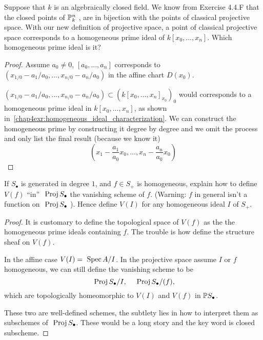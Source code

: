 \documentclass[11pt,fleqn]{book} %
\begin{document}
\begin{exr}
Suppose that $k$ is an algebraically closed field. We know from Exercise 4.4.F that the closed points of $\mathbb P^n_k$ , are in bijection with the points of classical projective space. With our new definition of projective space, a point of classical projective space corresponds to a homogeneous prime ideal of $k[x_0,...,x_n]$. Which homogeneous prime ideal is it?
\end{exr}
\begin{proof} Assume $a_0\neq 0$,
$[a_0,...,a_n]$ corresponds to $(x_{1/0}-a_1/a_0,...,x_{n/0}-a_n/a_0)$ in the affine chart $D(x_0)$.

$(x_{1/0}-a_1/a_0,...,x_{n/0}-a_n/a_0)\subset (k[x_0,...,x_n]_{x_0})_0$ would corresponds to a homogeneous prime ideal in $k[x_0,...,x_n]$, as shown in~\ref{chap4exr:homogeneous_ideal_characterization}. We can construct the homogeneous prime by constructing it degree by degree and we omit the process and only list the final result (because we know it)
$$
\left(x_1-\frac{a_1}{a_0}x_0,...,x_n-\frac{a_n}{a_0}x_0\right)
$$
\end{proof}

\begin{exr}
If $S_\bullet$ is generated in degree $1$, and $f \in S_+$ is homogeneous, explain how to define $V(f)$ ``in'' $\text{ Proj\,} S_\bullet$ the vanishing scheme of $f$. 
(Warning: $f$ in general isn’t a function on $\text{ Proj\,} S_\bullet$ ). Hence define $V(I)$ for any homogeneous ideal $I$ of $S_+$.
\end{exr}
\begin{proof}
It is customary to define the topological space of $V(f)$ as the the homogeneous prime ideals containing $f$. The trouble is how define the structure sheaf on $V(f)$. 

In the affine case $V(I)=\text{ Spec\,} A/I$. In the projective space assume $I$ or $f$ homogeneous, we can still define the vanishing scheme to be
$$
\text{ Proj\,} S_\bullet/I,\ \ \ \text{ Proj\,} S_\bullet/(f),
$$
which are topologically homeomorphic to $V(I)$ and $V(f)$ in $\mathbb P S_\bullet$.


These two are well-defined schemes,
the subtlety lies in how to interpret them as subschemes of $\text{ Proj\,} S_\bullet$. These would be a long story and the key word is closed subscheme.
\end{proof}
\end{document}
